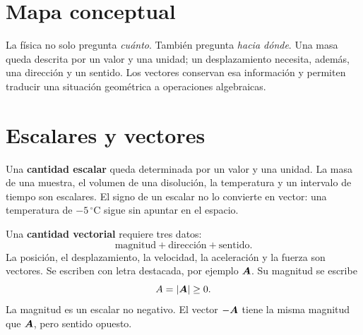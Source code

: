 \documentclass[11pt]{article}
\begin{document}

\tableofcontents
\inicioContenido

\section{Mapa conceptual}


La física no solo pregunta \emph{cuánto}. También pregunta \emph{hacia dónde}.
Una masa queda descrita por un valor y una unidad; un desplazamiento necesita,
además, una dirección y un sentido. Los vectores conservan esa información y
permiten traducir una situación geométrica a operaciones algebraicas.

\section{Escalares y vectores}

Una \textbf{cantidad escalar} queda determinada por un valor y una unidad. La
masa de una muestra, el volumen de una disolución, la temperatura y un
intervalo de tiempo son escalares. El signo de un escalar no lo convierte en
vector: una temperatura de \(-5\,^\circ\mathrm{C}\) sigue sin apuntar en el
espacio.

Una \textbf{cantidad vectorial} requiere tres datos:
\[
  \text{magnitud}
  +\text{dirección}
  +\text{sentido}.
\]
La posición, el desplazamiento, la velocidad, la aceleración y la fuerza son
vectores. Se escriben con letra destacada, por ejemplo \(\boldsymbol{A}\). Su
magnitud se escribe
\[
  A=|\boldsymbol{A}|\geq 0.
\]
La magnitud es un escalar no negativo. El vector \(-\boldsymbol{A}\) tiene la misma
magnitud que \(\boldsymbol{A}\), pero sentido opuesto.
\end{document}
